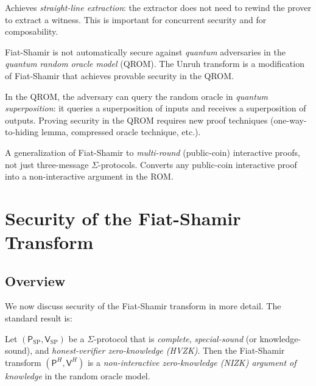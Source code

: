 \documentclass[11pt]{article}
\begin{document}
\begin{tcolorbox}[colback=yellow!5, colframe=orange!60!black,
                  title={Variants and Extensions}]
\begin{description}[leftmargin=2em]
  \item[Fischlin / Pass transform.]
        Achieves \emph{straight-line extraction}: the extractor does not
        need to rewind the prover to extract a witness.  This is important
        for concurrent security and for composability.

  \item[Unruh transform / QROM.]
        Fiat-Shamir is not automatically secure against \emph{quantum}
        adversaries in the \emph{quantum random oracle model} (QROM).
        The Unruh transform is a modification of Fiat-Shamir that
        achieves provable security in the QROM.

  \item[``Quantum'' ROM (QROM).]
        In the QROM, the adversary can query the random oracle in
        \emph{quantum superposition}: it queries a superposition of
        inputs and receives a superposition of outputs.  Proving
        security in the QROM requires new proof techniques
        (one-way-to-hiding lemma, compressed oracle technique, etc.).

  \item[``BCS'' transform.]
        A generalization of Fiat-Shamir to \emph{multi-round}
        (public-coin) interactive proofs, not just three-message
        $\Sigma$-protocols.  Converts any public-coin interactive
        proof into a non-interactive argument in the ROM.
\end{description}
\end{tcolorbox}

\section{Security of the Fiat-Shamir Transform}

\subsection{Overview}

We now discuss security of the Fiat-Shamir transform in more detail.
The standard result is:

\begin{theorem}
  Let $(\mathsf{P}_{\mathrm{SP}}, \mathsf{V}_{\mathrm{SP}})$ be a
  $\Sigma$-protocol that is \emph{complete}, \emph{special-sound}
  (or knowledge-sound), and \emph{honest-verifier zero-knowledge
  (HVZK)}.  Then the Fiat-Shamir transform
  $(\mathsf{P}^{H}, \mathsf{V}^{H})$ is a \emph{non-interactive
  zero-knowledge (NIZK) argument of knowledge} in the random oracle
  model.
\end{theorem}
\end{document}
